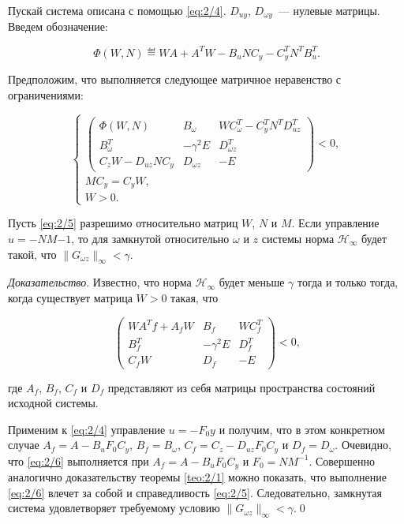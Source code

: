 \begin{teo}
\label{teo:2/3}
Пускай система описана с помощью \vref{eq:2/4}. $D_{uy}$, $D_{\omega y}$~--- нулевые матрицы. Введем обозначение:

$$
\Phi(W,N) \eqdef WA + A^TW - B_uNC_y - C^T_yN^TB^T_u\mbox{.}
$$

Предположим, что выполняется следующее матричное неравенство с ограничениями:

\begin{equation}
\label{eq:2/5}
\left\{
\begin{array}{l}
 \left( \begin{array}{ccc}
         \Phi(W,N)         & B_\omega     & WC^T_\omega - C^T_yN^TD^T_{uz} \\
         B^T_\omega        & -\gamma^2E   & D^T_{\omega z} \\
         C_zW - D_{uz}NC_y & D_{\omega z} & -E
        \end{array}
 \right) < 0\mbox{,} \\
MC_y=C_yW\mbox{,} \\
W > 0\mbox{.}
\end{array}
\right.
\end{equation}

Пусть \vref{eq:2/5} разрешимо относительно матриц $W$, $N$ и $M$. Если управление $u=-NM{-1}$, то для замкнутой относительно $\omega$ и $z$ системы норма $\mathcal{H}_\infty$ будет такой, что $\|G_{\omega z}\|_\infty < \gamma$.

\end{teo}

\emph{Доказательство}.
Известно\cite{BOYD}, что норма $\mathcal{H}_\infty$ будет меньше $\gamma$ тогда и только тогда, когда существует матрица $W>0$ такая, что

\begin{equation}
\label{eq:2/6}
\left( \begin{array}{ccc}
        WA^Tf+A_fW    & B_f           & WC^T_f \\
        B^T_f         & -\gamma^2E    & D^T_f \\
        C_fW          & D_f           & -E
       \end{array}
\right) < 0\mbox{,}
\end{equation}

где $A_f$, $B_f$, $C_f$ и $D_f$ представляют из себя матрицы пространства состояний исходной системы.

Применим к \vref{eq:2/4} управление $u=-F_0y$ и получим, что в этом конкретном случае $A_f = A-B_uF_0C_y$, $B_f = B_\omega$, $C_f = C_z - D_{uz}F_0C_y$ и $D_f = D_\omega$. Очевидно, что \vref{eq:2/6} выполняется при $A_f = A-B_uF_0C_y$ и $F_0 = NM^{-1}$. Совершенно аналогично доказательству теоремы \vref{teo:2/1} можно показать, что выполнение \vref{eq:2/6} влечет за собой и справедливость \vref{eq:2/5}. Следовательно, замкнутая система удовлетворяет требуемому условию $\|G_{\omega z}\|_\infty < \gamma$.\qed\br



